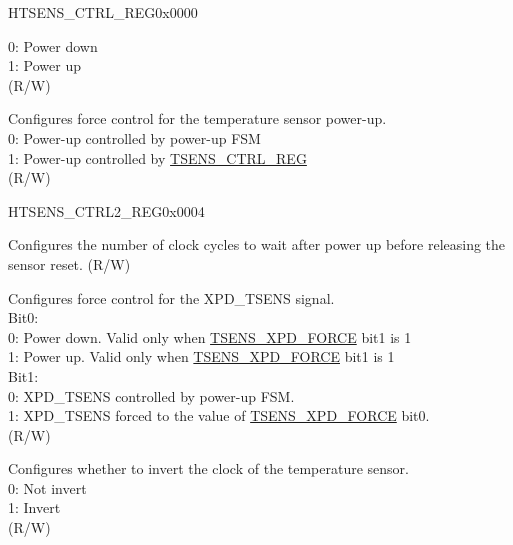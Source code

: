 \begin{register}{H}{TSENS\_CTRL\_REG}{0x0000}
\begin{regdesc}
\begin{reglist}
0: Power down\\
1: Power up\\
(R/W)
\label{fielddesc:TSENSPOWERUPFORCE}\item [TSENS\_POWER\_UP\_FORCE] Configures force control for the temperature sensor power-up.\\
0: Power-up controlled by power-up FSM\\
1: Power-up controlled by \hyperref[regdesc:TSENSCTRLREG]{TSENS\_CTRL\_REG}\\
(R/W)
\end{reglist}\end{regdesc}
\end{register}


\begin{register}{H}{TSENS\_CTRL2\_REG}{0x0004}\label{regdesc:TSENSCTRL2REG}
%
%
%
%
\regnewline%
\begin{regdesc}\begin{reglist}
\label{fielddesc:TSENSXPDWAIT}\item [TSENS\_XPD\_WAIT] Configures the number of clock cycles to wait after power up before releasing the sensor reset. (R/W)
\label{fielddesc:TSENSXPDFORCE}\item [TSENS\_XPD\_FORCE] Configures force control for the XPD\_TSENS signal.\\
Bit0:\\
0: Power down. Valid only when \hyperref[fielddesc:TSENSXPDFORCE]{TSENS\_XPD\_FORCE} bit1 is 1\\
1: Power up. Valid only when \hyperref[fielddesc:TSENSXPDFORCE]{TSENS\_XPD\_FORCE} bit1 is 1\\
Bit1:\\
0: XPD\_TSENS controlled by power-up FSM.\\
1: XPD\_TSENS forced to the value of \hyperref[fielddesc:TSENSXPDFORCE]{TSENS\_XPD\_FORCE} bit0.\\
(R/W)
\label{fielddesc:TSENSCLKINV}\item [TSENS\_CLK\_INV] Configures whether to invert the clock of the temperature sensor.\\
0: Not invert\\
1: Invert\\
(R/W)
\end{reglist}\end{regdesc}
\end{register}


